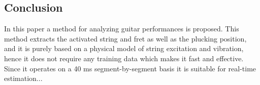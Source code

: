 \documentclass{article}
\begin{document}
\begin{sloppy}
\section{Conclusion}
In this paper a method for analyzing guitar performances is proposed. This method extracts the activated string and fret as well as the plucking position, and it is purely based on a physical model of string excitation and vibration, hence it does not require any training data which makes it fast and effective. Since it operates on a 40 ms segment-by-segment basis it is suitable for real-time estimation...
%


%
% 
%
%
%
% 
%
% 
% 


\end{sloppy}
\end{document}
